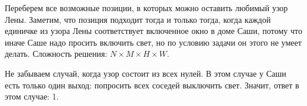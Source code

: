 \solutionSection

Переберем все возможные позиции, в которых можно оставить любимый узор Лены. Заметим, что позиция подходит тогда и только тогда, когда каждой единичке из узора Лены соответствует включенное окно в доме Саши, потому что иначе Саше надо просить включить свет, но по условию задачи он этого не умеет делать. Сложность решения: $N \times M \times H \times W$.

Не забываем случай, когда узор состоит из всех нулей. В этом случае у Саши есть только один выход: попросить всех соседей выключить свет. Значит, ответ в этом случае: 1.

\codeExample

